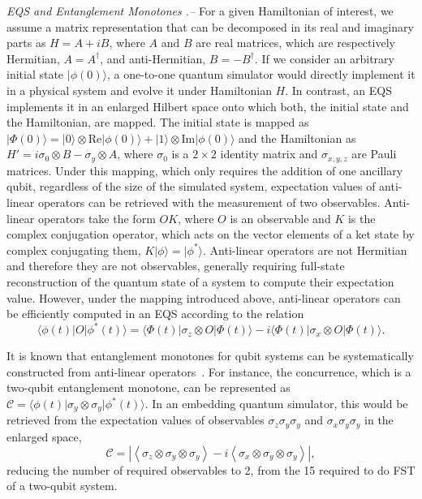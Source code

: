 \documentclass[10pt,nofootinbib,notitlepage,twocolumn,superscriptaddress]{revtex4-1}
\theoremstyle{plain}
\theoremstyle{definition}
\newcommand{\bra}[1]{\mbox{$\langle #1|$}}
\newcommand{\ket}[1]{\ensuremath{|#1\rangle}}
\begin{document}
{\it{EQS and Entanglement Monotones .--}} For a given Hamiltonian of interest, we assume a matrix representation that can be decomposed in its real and imaginary parts as $H=A+iB$, where $A$ and $B$ are real matrices, which are respectively Hermitian, $A=A^\dag$, and anti-Hermitian, $B=-B^\dag$. If we consider an arbitrary initial state $\ket{\phi(0)}$, a one-to-one quantum simulator would directly implement it in a physical system and evolve it under Hamiltonian $H$. In contrast, an EQS implements it in an enlarged Hilbert space onto which both, the initial state and the Hamiltonian, are mapped. The initial state is mapped as $\ket{\Phi(0)}=\ket{0} \otimes \text{Re}\ket{\phi(0)}+\ket{1} \otimes \text{Im}\ket{\phi(0)}$ and the Hamiltonian as $H'=i\sigma_0\otimes B-\sigma_y\otimes A$, where $\sigma_0$ is a $2\times2$ identity matrix and $\sigma_{x,y,z}$ are Pauli matrices. Under this mapping, which only requires the addition of one ancillary qubit, regardless of the size of the simulated system, expectation values of anti-linear operators can be retrieved with the measurement of two observables. Anti-linear operators take the form $OK$, where $O$ is an observable and $K$ is the complex conjugation operator, which acts on the vector elements of a ket state by complex conjugating them, $K \ket{\phi}=\ket{\phi^*}$. Anti-linear operators are not Hermitian and therefore they are not observables, generally requiring full-state reconstruction of the quantum state of a system to compute their expectation value. However, under the mapping introduced above, anti-linear operators can be efficiently computed in an EQS according to the relation
 \begin{equation}
\bra{\phi(t)}O\ket{\phi^*(t)}=\bra{\Phi(t)}\sigma_z\otimes O\ket{\Phi(t)}-i\bra{\Phi(t)}\sigma_x\otimes O\ket{\Phi(t)}.
\end{equation}

It is known that entanglement monotones for qubit systems can be systematically constructed from anti-linear operators~\cite{Siewert05}. For instance, the concurrence, which is a two-qubit entanglement monotone, can be represented as $\mathcal{C}=\bra{\phi(t)}\sigma_y\otimes \sigma_y\ket{\phi^*(t)}$. In an embedding quantum simulator, this would be retrieved from the expectation values of observables $\sigma_z\sigma_y\sigma_y$ and $\sigma_x\sigma_y\sigma_y$ in the enlarged space,
 \begin{equation}
\mathcal{C}=\left| \left \langle \sigma_z\otimes \sigma_y\otimes \sigma_y \right \rangle-i\left \langle\sigma_x\otimes \sigma_y\otimes \sigma_y \right \rangle\right|,
\end{equation}
reducing the number of required observables to 2, from the 15 required to do FST of a two-qubit system.
\end{document}
